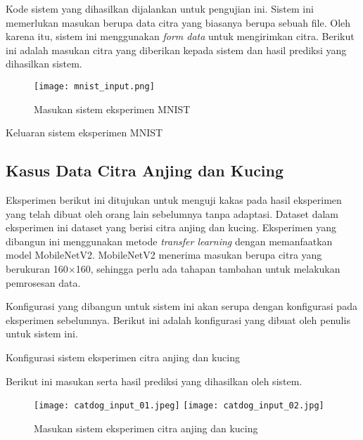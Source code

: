 Kode sistem yang dihasilkan dijalankan untuk pengujian ini.
Sistem ini memerlukan masukan berupa data citra yang biasanya berupa sebuah file.
Oleh karena itu, sistem ini menggunakan \textit{form data} untuk mengirimkan citra.
Berikut ini adalah masukan citra yang diberikan kepada sistem dan hasil prediksi yang dihasilkan sistem.

\begin{figure}[H]
    \centering
    \texttt{[image: mnist\_input.png]}
    \caption{Masukan sistem eksperimen MNIST}\label{fig:mnist-input}
\end{figure}

\begin{code}
	\caption{Keluaran sistem eksperimen MNIST}\label{listing:27}
\end{code}

\subsection{Kasus Data Citra Anjing dan Kucing}

Eksperimen berikut ini ditujukan untuk menguji kakas pada hasil eksperimen yang telah dibuat oleh orang lain sebelumnya tanpa adaptasi.
Dataset dalam eksperimen ini dataset yang berisi citra anjing dan kucing.
Eksperimen yang dibangun ini menggunakan metode \textit{transfer learning} dengan memanfaatkan model MobileNetV2.
MobileNetV2 menerima masukan berupa citra yang berukuran 160\(\times\)160, sehingga perlu ada tahapan tambahan untuk melakukan pemrosesan data.

Konfigurasi yang dibangun untuk sistem ini akan serupa dengan konfigurasi pada eksperimen sebelumnya.
Berikut ini adalah konfigurasi yang dibuat oleh penulis untuk sistem ini.

\begin{code}
	\caption{Konfigurasi sistem eksperimen citra anjing dan kucing}\label{listing:28}
\end{code}

Berikut ini masukan serta hasil prediksi yang dihasilkan oleh sistem.

\begin{figure}[H]
    \centering
    \texttt{[image: catdog\_input\_01.jpeg]}
    \texttt{[image: catdog\_input\_02.jpg]}
    \caption{Masukan sistem eksperimen citra anjing dan kucing}\label{fig:catdog-input}
\end{figure}

